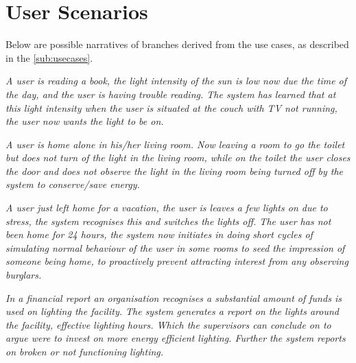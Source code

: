 \section{User Scenarios}\label{sub:userscenarios}

Below are possible narratives of branches derived from the use cases, as described in the \cref{sub:usecases}.

\textit{A user is reading a book, the light intensity of the sun is low now due the time of the day, and the user is having trouble reading. The system has learned that at this light intensity when the user is situated at the couch with TV not running, the user now wants the light to be on.}

\textit{A user is home alone in his/her living room. Now leaving a room to go the toilet but does not turn of the light in the living room, while on the toilet the user closes the door and does not observe the light in the living room being turned off by the system to conserve/save energy.}

\textit{A user just left home for a vacation, the user is leaves a few lights on due to stress, the system recognises this and switches the lights off. The user has not been home for 24 hours, the system now initiates in doing short cycles of simulating normal behaviour of the user in some rooms to seed the impression of someone being home, to proactively prevent attracting interest from any observing burglars.}

\textit{In a financial report an organisation recognises a substantial amount of funds is used on lighting the facility. The system generates a report on the lights around the facility, effective lighting hours. Which the supervisors can conclude on to argue were to invest on more energy efficient lighting. Further the system reports on broken or not functioning lighting.}


